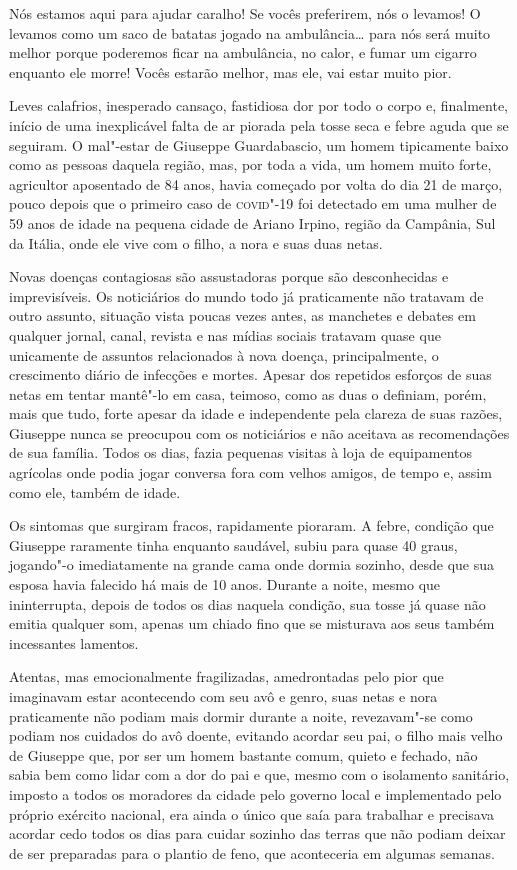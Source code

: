 
\epigraph{Nós estamos aqui para ajudar caralho! Se vocês preferirem, nós o
levamos! O levamos como um saco de batatas jogado na ambulância\ldots{} para
nós será muito melhor porque poderemos ficar na ambulância, no calor, e
fumar um cigarro enquanto ele morre! Vocês estarão melhor, mas ele, vai
estar muito pior.}{}

\noindent{}Leves calafrios, inesperado cansaço, fastidiosa dor por todo o corpo e,
finalmente, início de uma inexplicável falta de ar piorada pela tosse
seca e febre aguda que se seguiram. O mal"-estar de Giuseppe
Guardabascio, um homem tipicamente baixo como as pessoas daquela região,
mas, por toda a vida, um homem muito forte, agricultor aposentado de 84
anos, havia começado por volta do dia 21 de março, pouco depois que o
primeiro caso de \textsc{covid}"-19 foi detectado em uma mulher de 59 anos de
idade na pequena cidade de Ariano Irpino, região da Campânia, Sul da
Itália, onde ele vive com o filho, a nora e suas duas netas.

Novas doenças contagiosas são assustadoras porque são desconhecidas e
imprevisíveis. Os noticiários do mundo todo já praticamente não tratavam
de outro assunto, situação vista poucas vezes antes, as manchetes e
debates em qualquer jornal, canal, revista e nas mídias sociais tratavam
quase que unicamente de assuntos relacionados à nova doença,
principalmente, o crescimento diário de infecções e mortes. Apesar dos
repetidos esforços de suas netas em tentar mantê"-lo em casa, teimoso,
como as duas o definiam, porém, mais que tudo, forte apesar da idade e
independente pela clareza de suas razões, Giuseppe nunca se preocupou
com os noticiários e não aceitava as recomendações de sua família. Todos
os dias, fazia pequenas visitas à loja de equipamentos agrícolas onde
podia jogar conversa fora com velhos amigos, de tempo e, assim como ele,
também de idade.

Os sintomas que surgiram fracos, rapidamente pioraram. A febre, condição
que Giuseppe raramente tinha enquanto saudável, subiu para quase 40
graus, jogando"-o imediatamente na grande cama onde dormia sozinho, desde
que sua esposa havia falecido há mais de 10 anos. Durante a noite, mesmo
que ininterrupta, depois de todos os dias naquela condição, sua tosse já
quase não emitia qualquer som, apenas um chiado fino que se misturava
aos seus também incessantes lamentos.

Atentas, mas emocionalmente fragilizadas, amedrontadas pelo pior que
imaginavam estar acontecendo com seu avô e genro, suas netas e nora
praticamente não podiam mais dormir durante a noite, revezavam"-se como
podiam nos cuidados do avô doente, evitando acordar seu pai, o filho
mais velho de Giuseppe que, por ser um homem bastante comum, quieto e
fechado, não sabia bem como lidar com a dor do pai e que, mesmo com o
isolamento sanitário, imposto a todos os moradores da cidade pelo
governo local e implementado pelo próprio exército nacional, era ainda o
único que saía para trabalhar e precisava acordar cedo todos os dias
para cuidar sozinho das terras que não podiam deixar de ser preparadas
para o plantio de feno, que aconteceria em algumas semanas.

